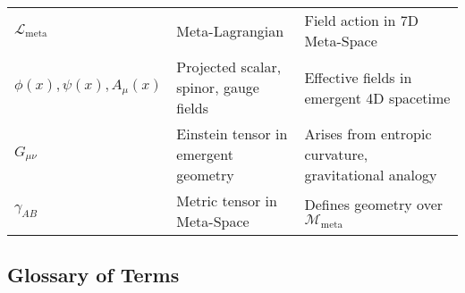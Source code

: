 \documentclass[10.5pt,a4paper]{article}
\begin{document}
{\begin{longtable}{p{4cm} p{7cm} p{6cm}}
\( \mathcal{L}_{\mathrm{meta}} \) & Meta-Lagrangian & Field action in 7D Meta-Space \\

\( \phi(x), \psi(x), A_\mu(x) \) & Projected scalar, spinor, gauge fields & Effective fields in emergent 4D spacetime \\

\( G_{\mu\nu} \) & Einstein tensor in emergent geometry & Arises from entropic curvature, gravitational analogy \\

\( \gamma_{AB} \) & Metric tensor in Meta-Space & Defines geometry over \( \mathcal{M}_{\mathrm{meta}} \) \\
\hline
\end{longtable}
}
\clearpage

\subsection{Glossary of Terms}
\end{document}
